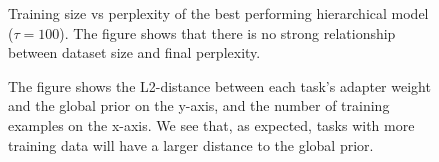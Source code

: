 \documentclass{article}
\begin{document}
\begin{figure}
    \centering
    \caption{Training size vs perplexity of the best performing hierarchical model ($\tau = 100$). The figure shows that there is no strong relationship between dataset size and final perplexity.}
    \label{fig:absolute_improvement}
\end{figure}


\begin{figure}[h]
    \centering
    \caption{The figure shows the L2-distance between each task's adapter weight and the global prior on the y-axis, and the number of training examples on the x-axis. We see that, as expected, tasks with more training data will have a larger distance to the global prior.}
    \label{fig:weights_vs_datalen} 
\end{figure}
\end{document}
